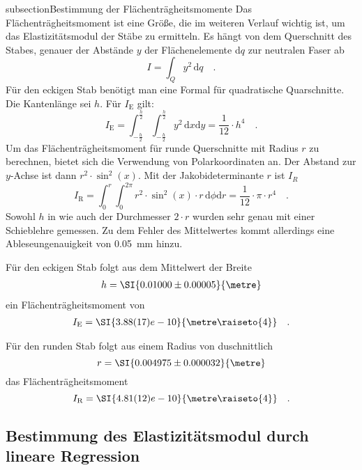 subsection{Bestimmung der Flächenträgheitsmomente}
Das Flächenträgheitsmoment ist eine Größe, die im weiteren Verlauf wichtig ist, um das Elastizitätsmodul der Stäbe zu ermitteln.
Es hängt von dem Querschnitt des Stabes, genauer der Abstände $y$ der Flächenelemente d$q$ zur neutralen Faser ab
\begin{equation}
I = \int_{Q} y ^2 \, \text{d}q \quad .
\end{equation}
Für den eckigen Stab benötigt man eine Formal für quadratische Quarschnitte. Die Kantenlänge sei $h$. Für $I_\text{E}$ gilt:
\begin{equation}
I_\text{E} = \int_{-\frac{h}{2}}^{\frac{h}{2}} \int_{-\frac{h}{2}}^{\frac{h}{2}} y^2\,  \text{d}x \text{d}y = \frac{1}{12} \cdot h^4 \quad .
\end{equation}
Um das Flächenträgheitsmoment für runde Querschnitte mit Radius $r$ zu berechnen, bietet sich die Verwendung von Polarkoordinaten an. Der Abstand zur $y$-Achse ist dann $r^2 \cdot \sin^2(x)$.  Mit der Jakobideterminante $r$ ist $I_R$
\begin{equation}
I_\text{R} = \int_{0}^{r}  \int_{0}^{2\pi} r^2 \cdot \sin^2(x) \cdot r  \, \text{d}\phi \text{d}r = \frac{1}{12}\cdot \pi \cdot r^4 \quad .
\end{equation}
Sowohl $h$ in wie auch der Durchmesser $2 \cdot r$ wurden sehr genau mit einer Schieblehre gemessen. Zu dem Fehler des Mittelwertes kommt allerdings eine Ableseungenauigkeit von \SI{0.05}{\milli\metre}  hinzu.



Für den eckigen Stab folgt aus dem Mittelwert der Breite
\begin{align}
  h = \SI{0.01000 \pm 0.00005}{\metre}
\end{align}
ein Flächenträgheitsmoment von
\begin{align}
I_\text{E}=\SI{3.88(17)e-10}{\metre\raiseto{4}} \quad .
\label{I_E}
\end{align}

Für den runden Stab folgt aus einem Radius von duschnittlich
\begin{equation}
  r = \SI{0.004975 \pm 0.000032}{\metre}
\end{equation}
das Flächenträgheitsmoment
\begin{equation}
  I_\text{R} = \SI{4.81(12)e-10}{\metre\raiseto{4}} \quad .
  \label{I_R}
\end{equation}


\subsection{Bestimmung des Elastizitätsmodul durch lineare Regression}
